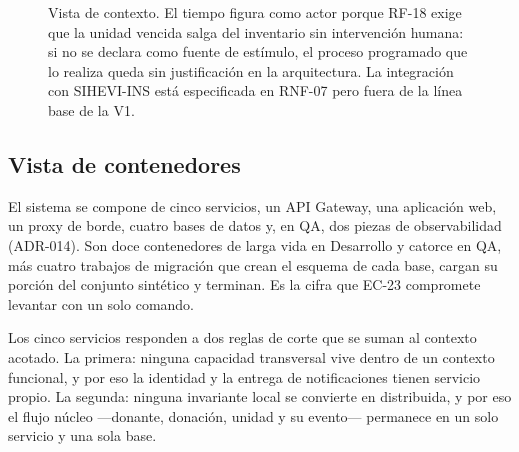 \documentclass[11pt,a4paper]{article}
\begin{document}
\begin{figure}[h!]
\caption[Vista de contexto del sistema]{Vista de contexto. El tiempo figura como actor porque RF-18 exige que la unidad vencida salga del inventario sin intervención humana: si no se declara como fuente de estímulo, el proceso programado que lo realiza queda sin justificación en la arquitectura. La integración con SIHEVI-INS está especificada en RNF-07 pero fuera de la línea base de la V1.}
\label{fig:contexto}
\end{figure}

\subsection{Vista de contenedores}

El sistema se compone de cinco servicios, un API Gateway, una aplicación web, un proxy de borde, cuatro bases de datos y, en QA, dos piezas de observabilidad (ADR-014). Son doce contenedores de larga vida en Desarrollo y catorce en QA, más cuatro trabajos de migración que crean el esquema de cada base, cargan su porción del conjunto sintético y terminan. Es la cifra que EC-23 compromete levantar con un solo comando.

Los cinco servicios responden a dos reglas de corte que se suman al contexto acotado. La primera: ninguna capacidad transversal vive dentro de un contexto funcional, y por eso la identidad y la entrega de notificaciones tienen servicio propio. La segunda: ninguna invariante local se convierte en distribuida, y por eso el flujo núcleo ---donante, donación, unidad y su evento--- permanece en un solo servicio y una sola base.
\end{document}
